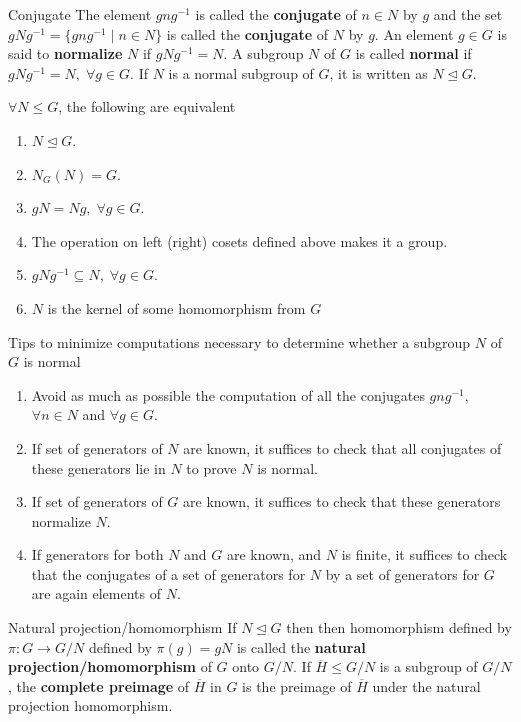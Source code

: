 \documentclass[titlepage, 12pt]{book}
\begin{document}
\begin{definition}{Conjugate}{}
    The element $gng^{-1}$ is called the \textbf{conjugate} of $n\in N$ by $g$
    and the set $gNg^{-1} = \{gng^{-1}\;|\;n\in N\}$ is called the
    \textbf{conjugate} of $N$ by $g$. An element $g\in G$ is said to
    \textbf{normalize} $N$ if $gNg^{-1} = N$. A subgroup $N$ of $G$ is called
    \textbf{normal} if $gNg^{-1} = N,\;\forall g\in G$. If $N$ is a normal
    subgroup of $G$, it is written as $N\trianglelefteq G$.
\end{definition}
\begin{theorem}{}{}
    $\forall N\le G$, the following are equivalent
    \begin{enumerate}
        \item $N\trianglelefteq G$.
        \item $N_G(N) = G$.
        \item $gN = Ng,\;\forall g\in G$.
        \item The operation on left (right) cosets defined above makes it a
            group.
        \item $gNg^{-1}\subseteq N,\;\forall g\in G$.
        \item $N$ is the kernel of some homomorphism from $G$
    \end{enumerate}
\end{theorem}
Tips to minimize computations necessary to determine whether a subgroup $N$ of
$G$ is normal
\begin{enumerate}
    \item Avoid as much as possible the computation of all the conjugates
        $gng^{-1}$, $\forall n\in N$ and $\forall g\in G$.
    \item If set of generators of $N$ are known, it suffices to check that all
        conjugates of these generators lie in $N$ to prove $N$ is normal.
    \item If set of generators of $G$ are known, it suffices to check that these
        generators normalize $N$.
    \item If generators for both $N$ and $G$ are known, and $N$ is finite, it
        suffices to check that the conjugates of a set of generators for $N$ by
        a set of generators for $G$ are again elements of $N$.
\end{enumerate}
\begin{definition}{Natural projection/homomorphism}{}
    If $N\trianglelefteq G$ then then homomorphism defined by $\pi:G\rightarrow
    G/N$ defined by $\pi(g) = gN$ is called the \textbf{natural
    projection/homomorphism} of $G$ onto $G/N$. If $\overline H\le G/N$ is a
    subgroup of $G/N$, the \textbf{complete preimage} of $\overline H$ in $G$ is
    the preimage of $\overline H$ under the natural projection homomorphism.
\end{definition}
\end{document}
